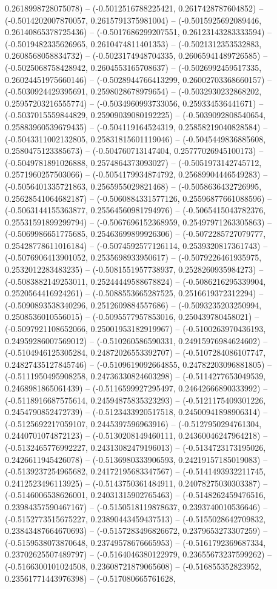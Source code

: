 0.2618998728075078) -- (-0.5012516788225421, 0.2617428787604852) -- (-0.5014202007870057, 0.2615791375981004) -- (-0.5015925692089446, 0.26140865378725436) -- (-0.5017686299207551, 0.26123143283333594) -- (-0.5019482335626965, 0.2610474811401353) -- (-0.5021312353532883, 0.2608568058834732) -- (-0.5023174948704335, 0.26065941489726585) -- (-0.5025068758428942, 0.2604553165708637) -- (-0.5026992459517335, 0.26024451975660146) -- (-0.5028944766413299, 0.26002703368660157) -- (-0.5030924429395691, 0.2598028678979654) -- (-0.5032930232868202, 0.25957203216555774) -- (-0.5034960993733056, 0.259334536441671) -- (-0.5037015559844829, 0.25909039080192225) -- (-0.5039092808540654, 0.25883960539679435) -- (-0.504119164524319, 0.25858219040828584) -- (-0.5043311002132805, 0.25831815601119046) -- (-0.5045449836885608, 0.2580475123385673) -- (-0.504760713147404, 0.25777026945100173) -- (-0.5049781891026888, 0.2574864373093027) -- (-0.5051973142745712, 0.2571960257503066) -- (-0.5054179934874792, 0.25689904446549283) -- (-0.5056401335721863, 0.2565955029821468) -- (-0.5058636432726995, 0.25628541064682187) -- (-0.5060884331577126, 0.25596877661088596) -- (-0.5063144155363877, 0.25564560981794976) -- (-0.5065415043782376, 0.25531591899299794) -- (-0.5067696152368959, 0.25497971263305863) -- (-0.5069986651775685, 0.25463699899926306) -- (-0.5072285727079777, 0.25428778611016184) -- (-0.5074592577126114, 0.2539320817361743) -- (-0.5076906413901052, 0.2535698933950617) -- (-0.5079226461935975, 0.2532012283483235) -- (-0.5081551957738937, 0.2528260935984273) -- (-0.5083882149253011, 0.25244449588678824) -- (-0.5086216295339904, 0.2520564416924261) -- (-0.5088553665287525, 0.2516619372312294) -- (-0.5090893538340296, 0.2512609884557686) -- (-0.5093235203250994, 0.2508536010556015) -- (-0.5095577957853016, 0.250439780458021) -- (-0.5097921108652066, 0.25001953182919967) -- (-0.5100263970436193, 0.24959286007569012) -- (-0.510260586590331, 0.24915976984624602) -- (-0.5104946125305284, 0.24872026553392707) -- (-0.5107284086107747, 0.24827435127845746) -- (-0.5109619092664855, 0.24782203096881805) -- (-0.5111950495908258, 0.24736330824603298) -- (-0.5114277653049539, 0.2468981865061439) -- (-0.5116599927295497, 0.24642666890333992) -- (-0.5118916687575614, 0.24594875835323293) -- (-0.5121175409301226, 0.2454790852472739) -- (-0.5123433920517518, 0.24500941898906314) -- (-0.5125692217059107, 0.2445397596963916) -- (-0.5127950294761304, 0.2440701074872123) -- (-0.5130208149460111, 0.24360046247964218) -- (-0.5132465776992227, 0.24313082479196013) -- (-0.5134723173195026, 0.2426611945426078) -- (-0.5136980333906593, 0.24219157185019083) -- (-0.5139237254965682, 0.24172195683347567) -- (-0.5141493932211745, 0.2412523496113925) -- (-0.5143750361484911, 0.24078275030303387) -- (-0.5146006538626001, 0.24031315902765463) -- (-0.5148262459476516, 0.23984357590467167) -- (-0.5150518119878637, 0.2393740010536646) -- (-0.5152773515675227, 0.23890443459437513) -- (-0.5155028642709832, 0.23843487664670693) -- (-0.5157283496826672, 0.2379653273307259) -- (-0.5159538073870648, 0.23749578676665953) -- (-0.5161792369687334, 0.23702625507489797) -- (-0.5164046380122979, 0.23655673237599262) -- (-0.5166300101024508, 0.23608721879065608) -- (-0.516855352823952, 0.23561771443976398) -- (-0.517080665761628, 